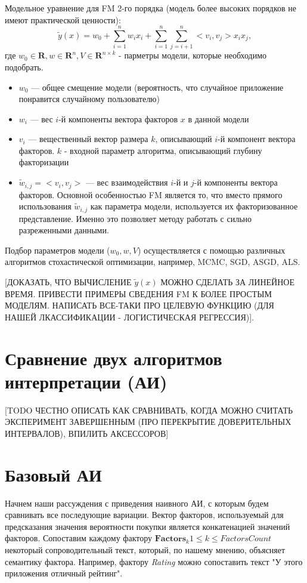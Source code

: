 \documentclass[12pt,a4paper]{report}
\begin{document}
Модельное уравнение для FM 2-го порядка (модель более высоких порядков не имеют практической ценности):
\begin{equation}
\tilde{y}(x) = w_0 + \sum_{i=1}^{n}w_ix_i + \sum_{i=1}^{n}\sum_{j=i+1}^{n}<v_i, v_j>x_ix_j,
\end{equation}
где $w_0 \in \textbf{R}, w \in \textbf{R}^n, V \in \textbf{R}^{n \times k}$ - парметры модели, которые необходимо подобрать.
\begin{itemize}
\item $w_0$ --- общее смещение модели (вероятность, что случайное приложение понравится случайному пользователю)
\item $w_i$ --- вес $i$-й компоненты вектора факторов $x$ в данной модели
\item $v_i$ --- вещественный вектор размера $k$, описывающий $i$-й компонент вектора факторов. $k$ -  входной параметр алгоритма, описывающий глубину факторизации
\item $\tilde{w}_{i,j} = <v_i, v_j>$ --- вес взаимодействия $i$-й и $j$-й компоненты вектора факторов. Основной особенностью FM является то, что вместо прямого использования $\tilde{w}_{i,j}$ как параметра модели, используется их факторизованное представление. Именно это позволяет методу работать с сильно разреженными данными.
\end{itemize}

Подбор параметров модели ($w_0, w, V$) осуществляется с помощью различных алгоритмов стохастической оптимизации, например, MCMC, SGD, ASGD, ALS.

[ДОКАЗАТЬ, ЧТО ВЫЧИСЛЕНИЕ $\tilde{y}(x)$ МОЖНО СДЕЛАТЬ ЗА ЛИНЕЙНОЕ ВРЕМЯ. ПРИВЕСТИ ПРИМЕРЫ СВЕДЕНИЯ FM К БОЛЕЕ ПРОСТЫМ МОДЕЛЯМ. НАПИСАТЬ ВСЕ-ТАКИ ПРО ЦЕЛЕВУЮ ФУНКЦИЮ (ДЛЯ НАШЕЙ ЛКАССИФИКАЦИИ - ЛОГИСТИЧЕСКАЯ РЕГРЕССИЯ)].

\section{Сравнение двух алгоритмов интерпретации (АИ)}
[TODO ЧЕСТНО ОПИСАТЬ КАК СРАВНИВАТЬ, КОГДА МОЖНО СЧИТАТЬ ЭКСПЕРИМЕНТ ЗАВЕРШЕННЫМ (ПРО ПЕРЕКРЫТИЕ ДОВЕРИТЕЛЬНЫХ ИНТЕРВАЛОВ), ВПИЛИТЬ АКСЕССОРОВ]

\section{Базовый АИ}
Начнем наши рассуждения с приведения наивного АИ, с которым будем сравнивать все последующие вариации.
Вектор факторов, используемый для предсказания значения вероятности покупки является конкатенацией значений факторов. Сопоставим каждому фактору $\textbf{Factors}_k 1 \le k \le FactorsCount$ некоторый сопроводительный текст, который, по нашему мнению, объясняет семантику фактора. Например, фактору \textit{Rating} можно сопоставить текст "У этого приложения отличный рейтинг".
\end{document}
